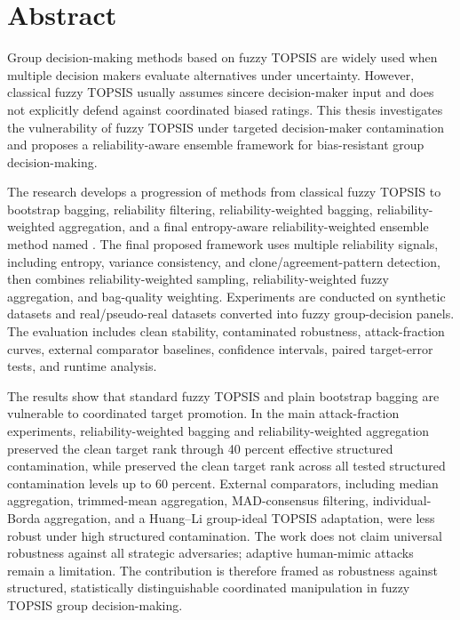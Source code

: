 \chapter*{Abstract}

Group decision-making methods based on fuzzy TOPSIS are widely used when multiple decision makers evaluate alternatives under uncertainty. However, classical fuzzy TOPSIS usually assumes sincere decision-maker input and does not explicitly defend against coordinated biased ratings. This thesis investigates the vulnerability of fuzzy TOPSIS under targeted decision-maker contamination and proposes a reliability-aware ensemble framework for bias-resistant group decision-making.

The research develops a progression of methods from classical fuzzy TOPSIS to bootstrap bagging, reliability filtering, reliability-weighted bagging, reliability-weighted aggregation, and a final entropy-aware reliability-weighted ensemble method named \methodname. The final proposed framework uses multiple reliability signals, including entropy, variance consistency, and clone/agreement-pattern detection, then combines reliability-weighted sampling, reliability-weighted fuzzy aggregation, and bag-quality weighting. Experiments are conducted on synthetic datasets and real/pseudo-real datasets converted into fuzzy group-decision panels. The evaluation includes clean stability, contaminated robustness, attack-fraction curves, external comparator baselines, confidence intervals, paired target-error tests, and runtime analysis.

The results show that standard fuzzy TOPSIS and plain bootstrap bagging are vulnerable to coordinated target promotion. In the main attack-fraction experiments, reliability-weighted bagging and reliability-weighted aggregation preserved the clean target rank through 40 percent effective structured contamination, while \methodname{} preserved the clean target rank across all tested structured contamination levels up to 60 percent. External comparators, including median aggregation, trimmed-mean aggregation, MAD-consensus filtering, individual-Borda aggregation, and a Huang--Li group-ideal TOPSIS adaptation, were less robust under high structured contamination. The work does not claim universal robustness against all strategic adversaries; adaptive human-mimic attacks remain a limitation. The contribution is therefore framed as robustness against structured, statistically distinguishable coordinated manipulation in fuzzy TOPSIS group decision-making.
